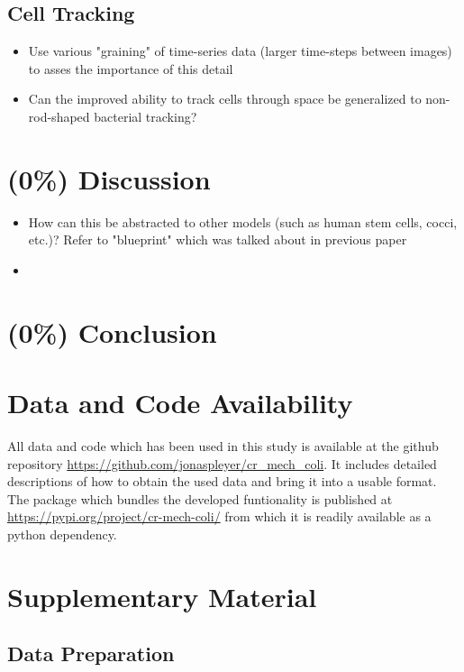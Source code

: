 \documentclass{article}
\begin{document}
\subsection{Cell Tracking}
\begin{itemize}
    \item Use various "graining" of time-series data (larger time-steps between images) to asses the
        importance of this detail
    \item Can the improved ability to track cells through space be generalized to non-rod-shaped
        bacterial tracking?
\end{itemize}

\section{(0\%) Discussion}
\begin{itemize}
    \item How can this be abstracted to other models (such as human stem cells, cocci, etc.)? Refer
        to "blueprint" which was talked about in previous paper
    \item 
\end{itemize}
\section{(0\%) Conclusion}

\section{Data and Code Availability}
All data and code which has been used in this study is available at the github repository
\url{https://github.com/jonaspleyer/cr\_mech\_coli}.
It includes detailed descriptions of how to obtain the used data and bring it into a usable format.
The package which bundles the developed funtionality is published at
\url{https://pypi.org/project/cr-mech-coli/} from which it is readily available as a python
dependency.




\appendix
\renewcommand{\thesection}{}
\renewcommand{\thesubsection}{S\arabic{subsection}}
\section{Supplementary Material}

\subsection{Data Preparation}
\end{document}
